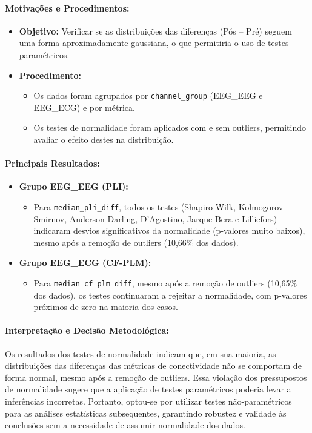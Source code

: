 \paragraph{Motivações e Procedimentos:}
\begin{itemize}
    \item \textbf{Objetivo:} Verificar se as distribuições das diferenças (Pós -- Pré) seguem uma forma aproximadamente gaussiana, o que permitiria o uso de testes paramétricos.
    \item \textbf{Procedimento:} 
    \begin{itemize}
        \item Os dados foram agrupados por \texttt{channel\_group} (EEG\_EEG e EEG\_ECG) e por métrica.
        \item Os testes de normalidade foram aplicados com e sem outliers, permitindo avaliar o efeito destes na distribuição.
    \end{itemize}
\end{itemize}

\paragraph{Principais Resultados:}
\begin{itemize}
    \item \textbf{Grupo EEG\_EEG (PLI):}
    \begin{itemize}
        \item Para \texttt{median\_pli\_diff}, todos os testes (Shapiro-Wilk, Kolmogorov-Smirnov, Anderson-Darling, D'Agostino, Jarque-Bera e Lilliefors) indicaram desvios significativos da normalidade (p-valores muito baixos), mesmo após a remoção de outliers (10,66\% dos dados).
    \end{itemize}
    \item \textbf{Grupo EEG\_ECG (CF-PLM):}
    \begin{itemize}
        \item Para \texttt{median\_cf\_plm\_diff}, mesmo após a remoção de outliers (10,65\% dos dados), os testes continuaram a rejeitar a normalidade, com p-valores próximos de zero na maioria dos casos.
    \end{itemize}
\end{itemize}

\paragraph{Interpretação e Decisão Metodológica:}
Os resultados dos testes de normalidade indicam que, em sua maioria, as distribuições das diferenças das métricas de conectividade não se comportam de forma normal, mesmo após a remoção de outliers. Essa violação dos pressupostos de normalidade sugere que a aplicação de testes paramétricos poderia levar a inferências incorretas. Portanto, optou-se por utilizar testes não-paramétricos para as análises estatísticas subsequentes, garantindo robustez e validade às conclusões sem a necessidade de assumir normalidade dos dados.
